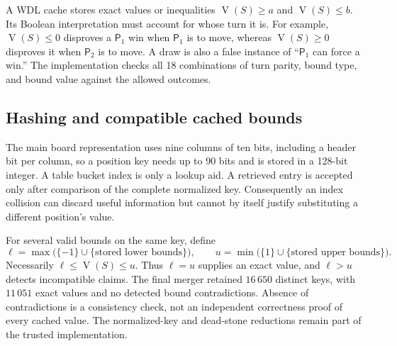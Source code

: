 \documentclass[11pt]{article}
\theoremstyle{definition}
\theoremstyle{remark}
\newcommand{\Pone}{\mathsf{P}_1}
\newcommand{\Ptwo}{\mathsf{P}_2}
\newcommand{\Val}{\operatorname{V}}
\begin{document}
A WDL cache stores exact values or inequalities $\Val(S)\ge a$ and
$\Val(S)\le b$. Its Boolean interpretation must account for whose turn it
is. For example, $\Val(S)\le0$ disproves a $\Pone$ win when $\Pone$ is to
move, whereas $\Val(S)\ge0$ disproves it when $\Ptwo$ is to move. A draw is
also a false instance of ``$\Pone$ can force a win.'' The implementation
checks all 18 combinations of turn parity, bound type, and bound value
against the allowed outcomes.

\subsection[Hashing and cached bounds]{Hashing and compatible cached bounds}
The main board representation uses nine columns of ten bits, including a
header bit per column, so a position key needs up to 90 bits and is stored
in a 128-bit integer. A table bucket index is only a lookup aid. A retrieved
entry is accepted only after comparison of the complete normalized key.
Consequently an index collision can discard useful information but cannot
by itself justify substituting a different position's value.

For several valid bounds on the same key, define
\[
 \ell=\max\bigl(\{-1\}\cup\{\text{stored lower bounds}\}\bigr),\qquad
 u=\min\bigl(\{1\}\cup\{\text{stored upper bounds}\}\bigr).
\]
Necessarily $\ell\le\Val(S)\le u$. Thus $\ell=u$ supplies an exact value,
and $\ell>u$ detects incompatible claims. The final merger retained
$16\,650$ distinct keys, with $11\,051$ exact values and no detected bound
contradictions. Absence of contradictions is a consistency check, not an
independent correctness proof of every cached value. The normalized-key
and dead-stone reductions remain part of the trusted implementation.
\end{document}
